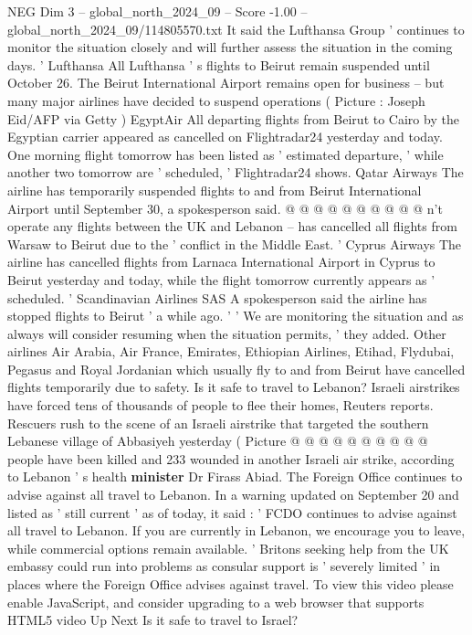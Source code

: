 \begin{textsample}{NEG Dim 3 – global\_north\_2024\_09 – Score -1.00 – global\_north\_2024\_09/114805570.txt}
It said the Lufthansa Group ' continues to monitor the situation closely and will further assess the situation in the coming days. ' Lufthansa All Lufthansa ' s flights to Beirut remain suspended until October 26.
The Beirut International Airport remains open for business -- but many major airlines have decided to suspend operations ( Picture : Joseph Eid/AFP via Getty ) EgyptAir All departing flights from Beirut to Cairo by the Egyptian carrier appeared as cancelled on Flightradar24 yesterday and today.
One morning flight tomorrow has been listed as ' estimated departure, ' while another two tomorrow are ' scheduled, ' Flightradar24 shows.
Qatar Airways The airline has temporarily suspended flights to and from Beirut International Airport until September 30, a spokesperson said. @ @ @ @ @ @ @ @ @ @ n't operate any flights between the UK and Lebanon -- has cancelled all flights from Warsaw to Beirut due to the ' conflict in the Middle East. ' Cyprus Airways The airline has cancelled flights from Larnaca International Airport in Cyprus to Beirut yesterday and today, while the flight tomorrow currently appears as ' scheduled. ' Scandinavian Airlines SAS A spokesperson said the airline has stopped flights to Beirut ' a while ago. ' ' We are monitoring the situation and as always will consider resuming when the situation permits, ' they added.
Other airlines Air Arabia, Air France, Emirates, Ethiopian Airlines, Etihad, Flydubai, Pegasus and Royal Jordanian which usually fly to and from Beirut have cancelled flights temporarily due to safety.
Is it safe to travel to Lebanon?
Israeli airstrikes have forced tens of thousands of people to flee their homes, Reuters reports.
Rescuers rush to the scene of an Israeli airstrike that targeted the southern Lebanese village of Abbasiyeh yesterday ( Picture @ @ @ @ @ @ @ @ @ @ people have been killed and 233 wounded in another Israeli air strike, according to Lebanon ' s health \textbf{minister} Dr Firass Abiad.
The Foreign Office continues to advise against all travel to Lebanon.
In a warning updated on September 20 and listed as ' still current ' as of today, it said : ' FCDO continues to advise against all travel to Lebanon.
If you are currently in Lebanon, we encourage you to leave, while commercial options remain available. ' Britons seeking help from the UK embassy could run into problems as consular support is ' severely limited ' in places where the Foreign Office advises against travel.
To view this video please enable JavaScript, and consider upgrading to a web browser that supports HTML5 video Up Next Is it safe to travel to Israel?

\end{textsample}
